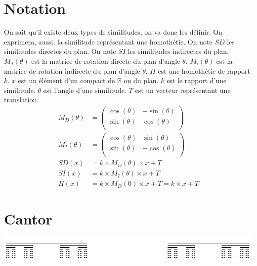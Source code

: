 \documentclass[a4paper, 12pt]{report}
\begin{document}
		\section{Notation}
			On sait qu'il existe deux types de similitudes, on va donc les définir. On exprimera, aussi, la similitude représentant une homothétie.
			\vspace{.3cm}
			On note $SD$ les similitudes directes du plan.\newline
			On note $SI$ les similitudes indirectes du plan.\newline
			$M_d(\theta)$ est la matrice de rotation directe du plan d'angle $\theta$.\newline
			$M_i(\theta)$ est la matrice de rotation indirecte du plan d'angle $\theta$.\newline
			$H$ est une homothétie de rapport $k$.
			$x$ est un élément d'un compact de $\mathds{R}$ ou du plan.\newline
			$k$ est le rapport d'une similitude.\newline
			$\theta$ est l'angle d'une similitude.\newline
			$T$ est un vecteur représentant une translation.\newline
			\begin{align*}
				M_D(\theta)&=\left(	\begin{array}{ccc}
								\cos(\theta) &  -\sin(\theta) \\
								\sin(\theta) &  \cos(\theta)  \\
									\end{array} \right)\\
				M_I(\theta)&=\left(	\begin{array}{ccc}
								\cos(\theta) &  \sin(\theta) \\
								\sin(\theta) &  -\cos(\theta)  \\
									\end{array} \right)\\
				SD(x)&=k\times M_D(\theta)\times x + T\\
				SI(x)&=k\times M_I(\theta)\times x + T\\
				H(x)&=k\times M_D(0)\times x +T=k\times x+T
			\end{align*}
\newpage
		\section{Cantor}
			\includegraphics[scale=0.8]{Images/cantor}
\end{document}
